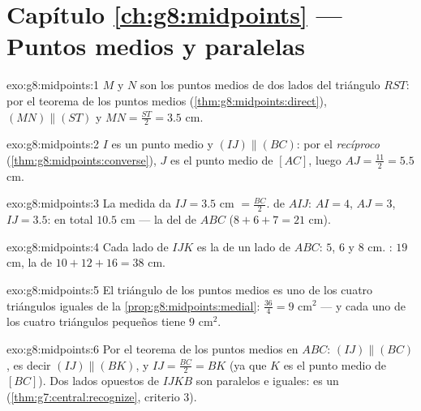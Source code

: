 \section*{Capítulo \ref{ch:g8:midpoints} --- Puntos medios y paralelas}

\begin{solution}{exo:g8:midpoints:1}
$M$ y $N$ son los puntos medios de dos lados del triángulo $RST$: por
el teorema de los puntos medios (\cref{thm:g8:midpoints:direct}),
$(MN) \parallel (ST)$ y $MN = \frac{ST}{2} = 3.5$ cm.
\end{solution}

\begin{solution}{exo:g8:midpoints:2}
$I$ es un punto medio y $(IJ) \parallel (BC)$: por el \emph{recíproco}
(\cref{thm:g8:midpoints:converse}), $J$ es el punto medio de $[AC]$,
luego $AJ = \frac{11}{2} = 5.5$ cm.
\end{solution}

\begin{solution}{exo:g8:midpoints:3}
La medida da $IJ = 3.5$ cm $= \frac{BC}{2}$.  de
$AIJ$: $AI = 4$, $AJ = 3$, $IJ = 3.5$: en total $10.5$ cm --- la  del
 de $ABC$ ($8 + 6 + 7 = 21$ cm).
\end{solution}

\begin{solution}{exo:g8:midpoints:4}
Cada lado de $IJK$ es la  de un lado de $ABC$: $5$, $6$ y $8$ cm.
: $19$ cm, la  de $10 + 12 + 16 = 38$ cm.
\end{solution}

\begin{solution}{exo:g8:midpoints:5}
El triángulo de los puntos medios es uno de los cuatro triángulos iguales de la
\cref{prop:g8:midpoints:medial}:  $\frac{36}{4} = 9$ cm$^2$ ---
y cada uno de los cuatro triángulos pequeños tiene  $9$ cm$^2$.
\end{solution}

\begin{solution}{exo:g8:midpoints:6}
Por el teorema de los puntos medios en $ABC$: $(IJ) \parallel (BC)$, es decir
$(IJ) \parallel (BK)$, y $IJ = \frac{BC}{2} = BK$ (ya que $K$ es el
punto medio de $[BC]$). Dos lados opuestos de $IJKB$ son paralelos e
iguales: es un 
(\cref{thm:g7:central:recognize}, criterio 3).
\end{solution}

